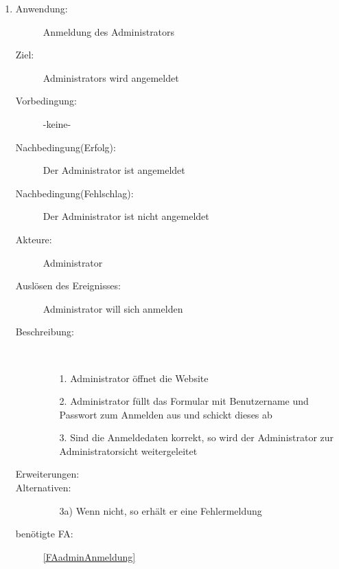 \documentclass[parskip=full]{scrartcl}
\newcommand{\swtLabel}[1]{\textbf{/#1\arabic*0/}}
\begin{document}
\begin{enumerate} [label=\swtLabel{A}]
	\item \label{UCadminAnmeldung}
    \begin{description}
    \item[Anwendung:] Anmeldung des Administrators
    \item[Ziel:] Administrators wird angemeldet
  	\item[Vorbedingung:] -keine-
  	\item[Nachbedingung(Erfolg):] Der Administrator ist angemeldet
  	\item[Nachbedingung(Fehlschlag):] Der Administrator ist nicht angemeldet
  	\item[Akteure:] Administrator
  	\item[Auslösen des Ereignisses:] Administrator will sich anmelden
  	\item[Beschreibung:]~
  	\begin{enumerate}
  	  \item[1.] Administrator öffnet die Website
  	  \item[2.] Administrator füllt das Formular mit Benutzername und Passwort zum Anmelden aus und schickt
  	  dieses ab %
  	  \item[3.] Sind die Anmeldedaten korrekt, so wird der Administrator zur
  	  Administratorsicht weitergeleitet
  	\end{enumerate}
  	\item[Erweiterungen:]  	
  	\item[Alternativen:]
	\begin{enumerate}
  	  \item[3a)] Wenn nicht, so erhält er eine Fehlermeldung
  	\end{enumerate}
  	\item[benötigte FA:] \ref{FAadminAnmeldung}
  \end{description}
	

\end{enumerate}
\end{document}
